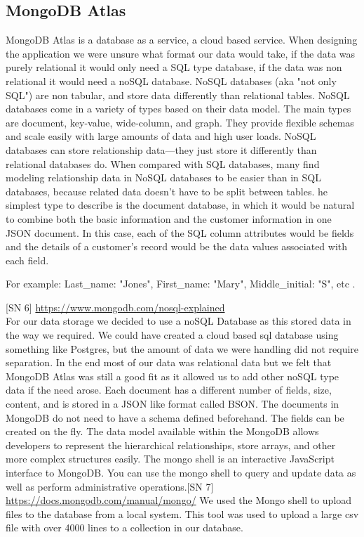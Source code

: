 \subsection{MongoDB Atlas}
MongoDB Atlas is a database as a service, a cloud based service.
When designing the application we were unsure what format our data would take, if the data was purely relational it would only need a SQL type database, if the data was non relational it would need a noSQL database. 
NoSQL databases (aka "not only SQL") are non tabular, and store data differently than relational tables. NoSQL databases come in a variety of types based on their data model. The main types are document, key-value, wide-column, and graph. They provide flexible schemas and scale easily with large amounts of data and high user loads.  NoSQL databases can store relationship data—they just store it differently than relational databases do. When compared with SQL databases, many find modeling relationship data in NoSQL databases to be easier than in SQL databases, because related data doesn’t have to be split between tables. he simplest type to describe is the document database, in which it would be natural to combine both the basic information and the customer information in one JSON document. In this case, each of the SQL column attributes would be fields and the details of a customer’s record would be the data values associated with each field.

For example: Last\_name: "Jones", First\_name: "Mary", Middle\_initial: "S", etc .


[SN 6] \url{https://www.mongodb.com/nosql-explained}\\
For our data storage we decided to use a noSQL Database as this stored data in the way we required. We could have created a cloud based sql database using something like Postgres, but the amount of data we were handling did not require separation.
In the end most of our data was relational data but we felt that MongoDB Atlas was still a good fit as it allowed us to add other noSQL type data if the need arose. Each document has a different number of fields, size, content, and is stored in a JSON like format called BSON. The documents in MongoDB do not need to have a schema defined beforehand. The fields can be created on the fly. The data model available within the MongoDB allows developers to represent the hierarchical relationships, store arrays, and other more complex structures easily.
The mongo shell is an interactive JavaScript interface to MongoDB. You can use the mongo shell to query and update data as well as perform administrative operations.[SN 7] \url{https://docs.mongodb.com/manual/mongo/}
We used the Mongo shell to upload files to the database from a local system. This tool was used to upload a large csv file with over 4000 lines to a collection in our database.

